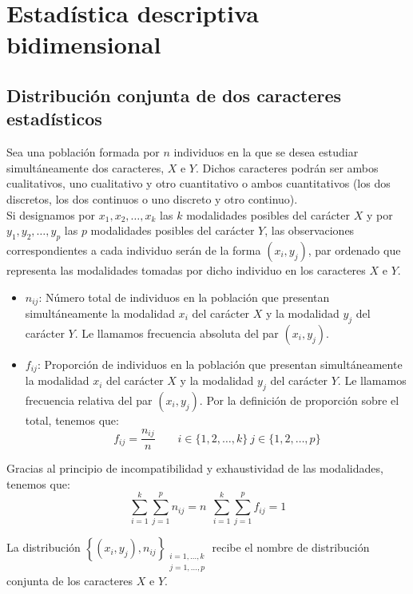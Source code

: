 \chapter{Estadística descriptiva bidimensional}

\section{Distribución conjunta de dos caracteres estadísticos}

Sea una población formada por $n$ individuos en la que se desea estudiar simultáneamente dos caracteres, $X$ e $Y$.
Dichos caracteres podrán ser ambos cualitativos, uno cualitativo y otro cuantitativo o ambos cuantitativos (los dos
discretos, los dos continuos o uno discreto y otro continuo).\\


Si designamos por $x_1, x_2, \ldots, x_k$ las $k$ modalidades posibles del carácter $X$ y por $y_1, y_2, \ldots, y_p$
las $p$ modalidades posibles del carácter $Y$, las observaciones correspondientes a cada individuo serán de la forma
$(x_i, y_j)$, par ordenado que representa las modalidades tomadas por dicho individuo en los caracteres $X$ e $Y$.

\begin{itemize}
    \item $n_{ij}$: Número total de individuos en la población que presentan simultáneamente la modalidad $x_i$ del carácter $X$
          y la modalidad $y_j$ del carácter $Y$. Le llamamos frecuencia absoluta del par $(x_i, y_j)$.
    \item $f_{ij}$: Proporción de individuos en la población que presentan simultáneamente la modalidad $x_i$ del
          carácter $X$ y la modalidad $y_j$ del carácter $Y$. Le llamamos frecuencia relativa del par $(x_i, y_j)$.
          Por la definición de proporción sobre el total, tenemos que:
          $$f_{ij} = \dfrac{n_{ij}}{n} \qquad i \in \{1, 2, \ldots, k\} ~ j \in \{1, 2, \ldots, p\}$$
\end{itemize}

Gracias al principio de incompatibilidad y exhaustividad de las modalidades, tenemos que:
$$\sum_{i=1}^k\sum_{j=1}^p n_{ij} = n ~~ \sum_{i=1}^k\sum_{j=1}^p f_{ij}=1$$

La distribución $\left\{ (x_i,y_j), n_{ij}\right\}_{\substack{i=1,\dots,k\\j=1,\dots,p}}$ recibe el nombre de distribución conjunta de los caracteres $X$ e $Y$.

